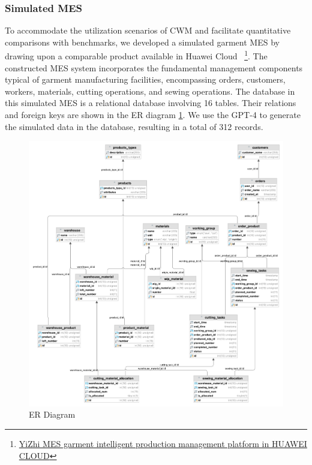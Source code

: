 \documentclass[preprint,12pt]{elsarticle}
\providecommand{\DIFaddend}{} %
\DeclareRobustCommand{\DIFaddend}{\DIFOaddend \let\includegraphics\DIFOincludegraphics} %
\begin{document}
\DIFaddend \subsubsection{Simulated MES}
To accommodate the utilization scenarios of CWM and facilitate quantitative comparisons with benchmarks, we developed a simulated garment MES by drawing upon a comparable product available in Huawei Cloud
~\footnote{\href{https://marketplace.huaweicloud.com/contents/da115457-cf31-47e1-bcff-965e5469d360\#productid=00301-608119-0--0}{YiZhi MES garment intelligent production management platform in HUAWEI CLOUD}}.
The constructed MES system incorporates the fundamental management components typical of garment manufacturing facilities, encompassing orders, customers, workers, materials, cutting operations, and sewing operations. 
The database in this simulated MES is a relational database involving 16 tables.
Their relations and foreign keys are shown in the ER diagram \ref{fig:er_diagram}.
We use the GPT-4 to generate the simulated data in the database, resulting in a total of 312 records.
\begin{figure}
        \centering
        \includegraphics[width=1.1\linewidth]{figs/garment.png}
        \caption{ER Diagram}
        \label{fig:er_diagram}
\end{figure}
\end{document}
